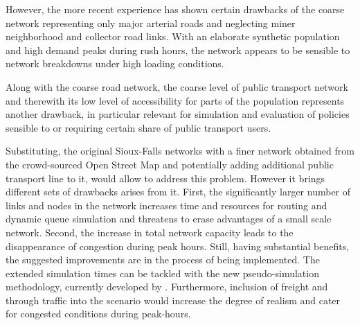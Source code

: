 However, the more recent experience has shown certain drawbacks of the coarse network representing only major arterial roads and neglecting miner neighborhood and collector road links. With an elaborate synthetic population and high demand peaks during rush hours, the network appears to be sensible to network breakdowns under high loading conditions. 

Along with the coarse road network, the coarse level of public transport network and therewith its low level of accessibility for parts of the population represents another drawback, in particular relevant for simulation and evaluation of policies sensible to or requiring certain share of public transport users. 

Substituting, the original Sioux-Falls networks with a finer network obtained from the crowd-sourced Open Street Map and potentially adding additional public transport line to it, would allow to address this problem. However it brings different sets of drawbacks arises from it. First, the significantly larger number of links and nodes in the network increases time and resources for routing and dynamic queue simulation and threatens to erase advantages of a small scale network. Second, the increase in total network capacity leads to the disappearance of congestion during peak hours. 
Still, having substantial benefits, the  suggested improvements are in the process of being implemented. The extended simulation times can be tackled with the new pseudo-simulation methodology, currently developed by \citet[][]{FourieEtAl_TRR_2013}. Furthermore, inclusion of freight and through traffic into the scenario would increase the degree of realism and cater for congested conditions during peak-hours. 


